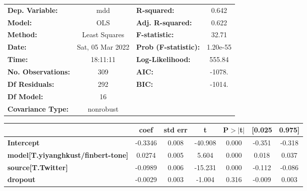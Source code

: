 \begin{center}
\begin{tabular}{lclc}
\toprule
\textbf{Dep. Variable:}                    &       mdd        & \textbf{  R-squared:         } &     0.642   \\
\textbf{Model:}                            &       OLS        & \textbf{  Adj. R-squared:    } &     0.622   \\
\textbf{Method:}                           &  Least Squares   & \textbf{  F-statistic:       } &     32.71   \\
\textbf{Date:}                             & Sat, 05 Mar 2022 & \textbf{  Prob (F-statistic):} &  1.20e-55   \\
\textbf{Time:}                             &     18:11:11     & \textbf{  Log-Likelihood:    } &    555.84   \\
\textbf{No. Observations:}                 &         309      & \textbf{  AIC:               } &    -1078.   \\
\textbf{Df Residuals:}                     &         292      & \textbf{  BIC:               } &    -1014.   \\
\textbf{Df Model:}                         &          16      & \textbf{                     } &             \\
\textbf{Covariance Type:}                  &    nonrobust     & \textbf{                     } &             \\
\bottomrule
\end{tabular}
\begin{tabular}{lcccccc}
                                           & \textbf{coef} & \textbf{std err} & \textbf{t} & \textbf{P$> |$t$|$} & \textbf{[0.025} & \textbf{0.975]}  \\
\midrule
\textbf{Intercept}                         &      -0.3346  &        0.008     &   -40.908  &         0.000        &       -0.351    &       -0.318     \\
\textbf{model[T.yiyanghkust/finbert-tone]} &       0.0274  &        0.005     &     5.604  &         0.000        &        0.018    &        0.037     \\
\textbf{source[T.Twitter]}                 &      -0.0989  &        0.006     &   -15.231  &         0.000        &       -0.112    &       -0.086     \\
\textbf{dropout}                           &      -0.0029  &        0.003     &    -1.004  &         0.316        &       -0.009    &        0.003     \\

\end{tabular}
\end{center}
